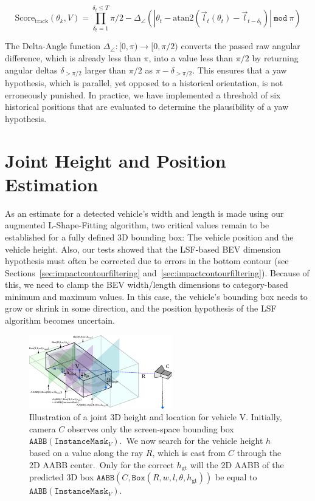 \[
    \text{Score}_\text{track}(\theta_k, V)=\prod_{\delta_t=1}^{\delta_t \leq T}\pi/2 - \Delta_\angle(|\theta_{t} - \text{atan2}(\vec{l}_t(\theta_t)-\vec{l}_{t-\delta_t})| \mathtt{~mod~}\pi)
\]

The Delta-Angle function $\Delta_\angle: [0, \pi) \rightarrow [0, \pi/2)$ converts the passed raw angular difference, which is already less than $\pi$, into a value less than $\pi/2$ by returning angular deltas $\delta_{>\pi/2}$ larger than $\pi/2$ as $\pi-\delta_{>\pi/2}$.
This ensures that a yaw hypothesis, which is parallel, yet opposed to a historical orientation, is not erroneously punished.
In practice, we have implemented a threshold of six historical positions that are evaluated to determine the plausibility of a yaw hypothesis.


\section{Joint Height and Position Estimation}
\label{sec:sizeandpos}

As an estimate for a detected vehicle's width and length is made using our augmented L-Shape-Fitting algorithm, two critical values remain to be established for a fully defined 3D bounding box: The vehicle position and the vehicle height.
Also, our tests showed that the LSF-based BEV dimension hypothesis must often be corrected due to errors in the bottom contour (see Sections~\ref{sec:impactcontourfiltering} and~\ref{sec:impactcontourfiltering}).
Because of this, we need to clamp the BEV width/length dimensions to category-based minimum and maximum values.
In this case, the vehicle's bounding box needs to grow or shrink in some direction, and the position hypothesis of the LSF algorithm becomes uncertain.

\begin{figure}[htb]
    \centering
    \includegraphics[width=1.0\linewidth]{figures/calc-height-pos}
    \caption{Illustration of a joint 3D height and location for vehicle V. Initially, camera $C$ observes only the screen-space bounding box $\mathtt{AABB}(\texttt{InstanceMask}_V)$.\ We now search for the vehicle height $h$ based on a value along the ray $R$, which is cast from $C$ through the 2D AABB center.\ Only for the correct $h_\text{gt}$ will the 2D AABB of the predicted 3D box $\mathtt{AABB}(C,\mathtt{Box}(R,w,l,\theta,h_\text{gt}))$ be equal to $\mathtt{AABB}(\texttt{InstanceMask}_V)$.}
    \label{fig:calcheightpos}
\end{figure}

